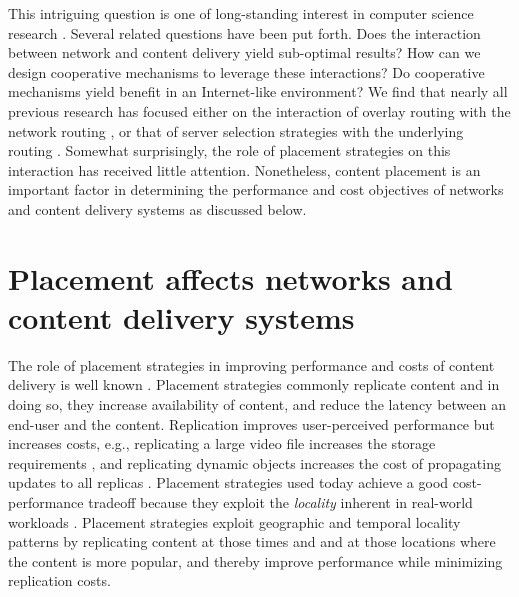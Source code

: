 This intriguing question is one of long-standing interest in computer science research  \cite{Roughgarden,selfishQiu,Jiang2009,JohariGameTheory, CATE, P4P}. 
Several related questions have been put forth. Does the interaction between network and content delivery yield sub-optimal results? How can we design cooperative mechanisms to leverage these interactions? Do cooperative mechanisms yield benefit in an Internet-like environment?
We find that nearly all previous research has focused either on the interaction of overlay routing with the network routing \cite{Roughgarden,selfishQiu}, or that of server selection strategies with the underlying routing  \cite{Jiang2009,JohariGameTheory, CATE, P4P}. 
Somewhat surprisingly, the role of placement strategies on this interaction has received little attention.  Nonetheless, content placement is an important factor in determining the performance and cost objectives of networks and content delivery systems as discussed below.



\section{Placement affects networks and content delivery systems}

The role of placement strategies in improving performance and costs of content delivery is well known \cite{Saroiu2002}. Placement strategies commonly replicate content and in doing so, they increase availability of content, and reduce the latency between an end-user and the content. Replication improves user-perceived performance but increases costs, e.g., replicating a large video file increases the storage requirements \cite{Applegate2010}, and replicating dynamic objects increases the cost of propagating updates to all replicas \cite{volley}. Placement strategies used today achieve a good cost-performance tradeoff because they exploit the \emph{locality} inherent in real-world workloads  \cite{NCDN, youtubeUGC, vodP2Pbenefit, cellularvideotraffic}. Placement strategies exploit geographic and temporal locality patterns by replicating content at those times and and at those locations where the content is more popular, and thereby improve performance while minimizing replication costs.


